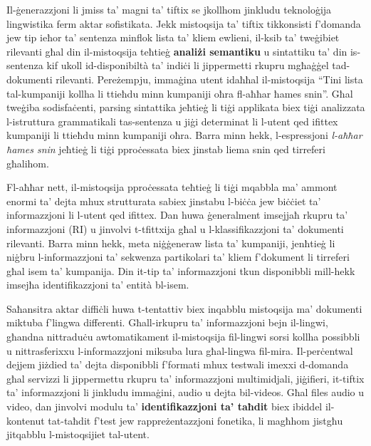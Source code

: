 \begin{multicols}{2}


Il-ġenerazzjoni li jmiss ta’ magni ta’ tiftix se jkollhom jinkludu teknoloġija lingwistika ferm aktar sofistikata. Jekk mistoqsija ta’ tiftix tikkonsisti f’domanda jew tip ieħor ta’ sentenza minflok lista ta’ kliem ewlieni, il-ksib ta’ tweġibiet rilevanti għal din il-mistoqsija teħtieġ \textbf{analiżi semantiku} u sintattiku ta’ din is-sentenza kif ukoll id-disponibiltà ta’ indiċi li jippermetti rkupru mgħaġġel tad-dokumenti rilevanti. Pereżempju, immaġina utent idaħħal il-mistoqsija “Tini lista tal-kumpaniji kollha li ttieħdu minn kumpaniji oħra fl-aħħar ħames snin”. Għal tweġiba sodisfaċenti, parsing sintattika jeħtieġ li tiġi applikata biex tiġi analizzata l-istruttura grammatikali tas-sentenza u jiġi determinat li l-utent qed ifittex kumpaniji li ttieħdu minn kumpaniji oħra. Barra minn hekk, l-espressjoni \emph{l-aħħar ħames snin} jeħtieġ li tiġi pproċessata biex jinstab liema snin qed tirreferi għalihom.

Fl-aħħar nett, il-mistoqsija pproċessata teħtieġ li tiġi mqabbla ma’ ammont enormi ta’ dejta mhux strutturata sabiex jinstabu l-biċċa jew biċċiet ta’ informazzjoni li l-utent qed ifittex. Dan huwa ġeneralment imsejjaħ rkupru ta’ informazzjoni (RI) u jinvolvi t-tfittxija għal u l-klassifikazzjoni ta’ dokumenti rilevanti. Barra minn hekk, meta niġġeneraw lista ta’ kumpaniji, jenħtieġ li niġbru l-informazzjoni ta’ sekwenza partikolari ta’ kliem f'dokument li tirreferi għal isem ta’ kumpanija. Din it-tip ta’ informazzjoni tkun disponibbli mill-hekk imsejħa identifikazzjoni ta’ entità bl-isem.

Saħansitra aktar diffiċli huwa t-tentattiv biex inqabblu mistoqsija ma’ dokumenti miktuba f'lingwa differenti. Għall-irkupru ta’ informazzjoni bejn il-lingwi, għandna nittraduċu awtomatikament il-mistoqsija fil-lingwi sorsi kollha possibbli u nittrasferixxu l-informazzjoni miksuba lura għal-lingwa fil-mira. Il-perċentwal dejjem jiżdied ta’ dejta disponibbli f'formati mhux testwali imexxi d-domanda għal servizzi li jippermettu rkupru ta’ informazzjoni multimidjali, jiġifieri, it-tiftix ta’ informazzjoni li jinkludu immaġini, audio u dejta bil-videos. Għal files audio u video, dan jinvolvi modulu ta’ \textbf{identifikazzjoni ta’ taħdit} biex ibiddel il-kontenut tat-taħdit f’test jew rappreżentazzjoni fonetika, li magħhom jistgħu jitqabblu l-mistoqsijiet tal-utent.


\end{multicols}
